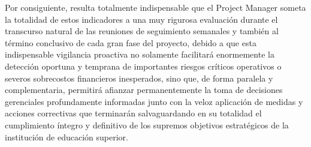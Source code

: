 \documentclass[11pt,spanish]{article}
\begin{document}
Por consiguiente, resulta totalmente indispensable que el Project Manager someta la totalidad de estos indicadores a una muy rigurosa evaluación durante el transcurso natural de las reuniones de seguimiento semanales y también al término conclusivo de cada gran fase del proyecto, debido a que esta indispensable vigilancia proactiva no solamente facilitará enormemente la detección oportuna y temprana de importantes riesgos críticos operativos o severos sobrecostos financieros inesperados, sino que, de forma paralela y complementaria, permitirá afianzar permanentemente la toma de decisiones gerenciales profundamente informadas junto con la veloz aplicación de medidas y acciones correctivas que terminarán salvaguardando en su totalidad el cumplimiento íntegro y definitivo de los supremos objetivos estratégicos de la institución de educación superior.
\end{document}
